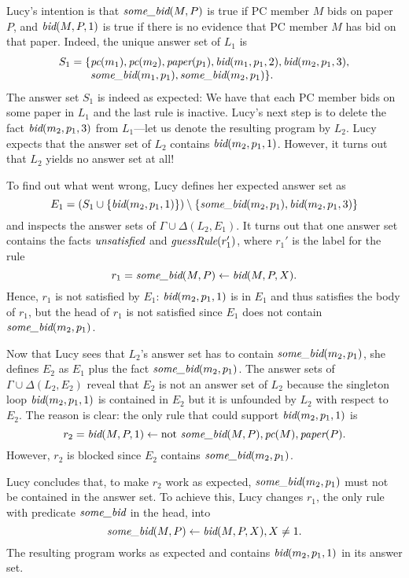 \documentclass{tlp}
\newcommand{\reif}[1]{\Delta(#1)}
\newcommand{\naf}{\mathrm{not}}
\newcommand{\wrt}{with respect to}
\renewcommand{\mathit}[1]{{\text{\it{#1}}}}
\begin{document}
Lucy's intention is that $\mathit{some\_bid}(M,P)$ is true if PC member $M$ bids on paper $P$, and 
$\mathit{bid}(M,P,1)$ is true if there is no evidence that PC member $M$ has bid on that paper.
Indeed, the unique answer set of $L_{1}$ is 
$$
\begin{array}{r@{}l}
S_{1} = 
\{& \mathit{pc}(m_1), \mathit{pc}(m_2), \mathit{paper}(p_1), \mathit{bid}(m_1,p_1,2),
\mathit{bid}(m_2,p_1,3), 
 \\&
\mathit{some\_bid}(m_1,p_1), \mathit{some\_bid}(m_2,p_1)  \}\mbox{.} 
\end{array}
$$
The answer set $S_{1}$ is indeed as expected:
We have that each PC member bids on some paper in $L_{1}$ and the 
last rule is inactive. Lucy's next step is to delete the fact $\mathit{bid}(m_2,p_1,3)$ from $L_{1}$---let us denote the 
resulting program by $L_{2}$.  Lucy expects that the answer set of $L_{2}$ contains $\mathit{bid}(m_2,p_1,1)$.
However, it turns out that $L_{2}$ yields no answer set at all!

To find out what went wrong, Lucy defines her expected answer set  as 
$$E_{1} = (S_{1} \cup \{\mathit{bid}(m_2,p_1,1)\}) \setminus 
            \{ \mathit{some\_bid}(m_2,p_1), \mathit{bid}(m_2,p_1,3)\}$$
and inspects the answer sets of $\Gamma \cup \reif{L_{2},E_{1}}$. 
It turns out that one answer set contains the facts $\mathit{unsatisfied}$ and $\mathit{guessRule}(r_{1}')$, where $r_{1}'$ is the label for the rule 
$$r_{1} = \mathit{some\_bid}(M,P) \leftarrow \mathit{bid}(M,P,X)\mbox{.}$$
Hence, $r_{1}$ is not satisfied by $E_{1}$:
$\mathit{bid}(m_2,p_1,1)$ is in $E_{1}$ and thus satisfies the body of $r_{1}$, but the head of $r_{1}$ is not
satisfied since $E_{1}$ does not contain $\mathit{some\_bid}(m_2,p_1)$.

Now that Lucy sees that $L_{2}$'s answer set has to contain $\mathit{some\_bid}(m_2,p_1)$, she defines
$E_{2}$ as $E_{1}$ plus the fact $\mathit{some\_bid}(m_2,p_1)$.
The answer sets of  $\Gamma \cup \reif{L_{2},E_{2}}$ reveal that $E_{2}$ is not an answer set of $L_{2}$ because
the singleton  loop $\mathit{bid}(m_2,p_1,1)$ is contained in $E_{2}$ but it is unfounded
by $L_{2}$ \wrt\ $E_{2}$.
The reason is clear:  the only rule that could support $\mathit{bid}(m_2,p_1,1)$ is 
$$r_{2} = \mathit{bid}(M,P,1) \leftarrow \naf\ \mathit{some\_bid}(M,P), \mathit{pc}(M),  \mathit{paper}(P)\mbox{.}$$
However, $r_{2}$ is
blocked since $E_{2}$ contains $\mathit{some\_bid}(m_2,p_1)$.

Lucy concludes that, to make $r_{2}$ work as expected, $\mathit{some\_bid}(m_2,p_1)$ must not be contained in the answer set.
To achieve this, Lucy changes $r_{1}$, the only rule with predicate $\mathit{some\_bid}$ in the head, into
$$\mathit{some\_bid}(M,P) \leftarrow \mathit{bid}(M,P,X), X \neq 1\mbox{.}$$
The resulting program works as expected and contains $\mathit{bid}(m_2,p_1,1)$ in its answer set.
\end{document}

